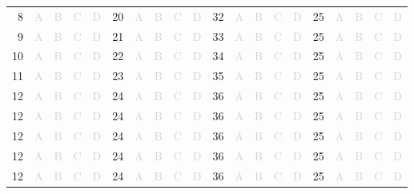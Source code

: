 \documentclass[a4paper,11pt]{article}
\newcommand{\light}[1]{\textcolor{lightgray}{#1}}
\begin{document}
\begin{center}
\begin{tabular}{r|c|c|c|c|r|c|c|c|c|r|c|c|c|c|r|c|c|c|c|}
\cline{2-5} \cline{7-10} \cline{12-15} \cline{17-20}
8& \light{A} & \light{B} & \light{C} & \light{D} & 20& \light{A} & \light{B} & \light{C} & \light{D} & 32& \light{A} & \light{B} & \light{C} & \light{D} & 25& \light{A} & \light{B} & \light{C} & \light{D}\\ 
\cline{2-5} \cline{7-10} \cline{12-15} \cline{17-20}
9& \light{A} & \light{B} & \light{C} & \light{D} & 21& \light{A} & \light{B} & \light{C} & \light{D} & 33& \light{A} & \light{B} & \light{C} & \light{D} & 25& \light{A} & \light{B} & \light{C} & \light{D}\\ 
\cline{2-5} \cline{7-10} \cline{12-15} \cline{17-20}
10& \light{A} & \light{B} & \light{C} & \light{D} & 22& \light{A} & \light{B} & \light{C} & \light{D} & 34& \light{A} & \light{B} & \light{C} & \light{D} & 25& \light{A} & \light{B} & \light{C} & \light{D}\\
\cline{2-5} \cline{7-10} \cline{12-15} \cline{17-20}
11& \light{A} & \light{B} & \light{C} & \light{D} & 23& \light{A} & \light{B} & \light{C} & \light{D} & 35& \light{A} & \light{B} & \light{C} & \light{D} & 25& \light{A} & \light{B} & \light{C} & \light{D}\\
\cline{2-5} \cline{7-10} \cline{12-15} \cline{17-20}
12& \light{A} & \light{B} & \light{C} & \light{D} & 24& \light{A} & \light{B} & \light{C} & \light{D} & 36& \light{A} & \light{B} & \light{C} & \light{D} & 25& \light{A} & \light{B} & \light{C} & \light{D}\\
\cline{2-5} \cline{7-10} \cline{12-15} \cline{17-20}
12& \light{A} & \light{B} & \light{C} & \light{D} & 24& \light{A} & \light{B} & \light{C} & \light{D} & 36& \light{A} & \light{B} & \light{C} & \light{D} & 25& \light{A} & \light{B} & \light{C} & \light{D}\\
\cline{2-5} \cline{7-10} \cline{12-15} \cline{17-20}
12& \light{A} & \light{B} & \light{C} & \light{D} & 24& \light{A} & \light{B} & \light{C} & \light{D} & 36& \light{A} & \light{B} & \light{C} & \light{D} & 25& \light{A} & \light{B} & \light{C} & \light{D}\\
\cline{2-5} \cline{7-10} \cline{12-15} \cline{17-20}
12& \light{A} & \light{B} & \light{C} & \light{D} & 24& \light{A} & \light{B} & \light{C} & \light{D} & 36& \light{A} & \light{B} & \light{C} & \light{D} & 25& \light{A} & \light{B} & \light{C} & \light{D}\\
\cline{2-5} \cline{7-10} \cline{12-15} \cline{17-20}
12& \light{A} & \light{B} & \light{C} & \light{D} & 24& \light{A} & \light{B} & \light{C} & \light{D} & 36& \light{A} & \light{B} & \light{C} & \light{D} & 25& \light{A} & \light{B} & \light{C} & \light{D}\\

\end{tabular}
\end{center}
\end{document}
